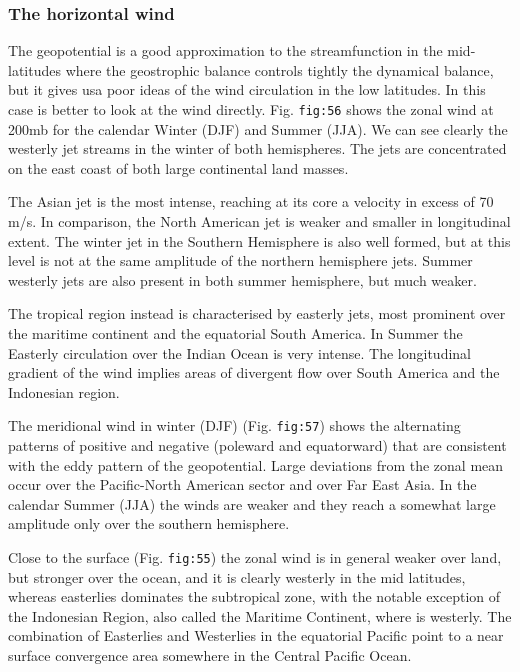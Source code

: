 \subsubsection{The horizontal wind}\label{the-horizontal-wind}

The geopotential is a good approximation to the streamfunction in the
mid-latitudes where the geostrophic balance controls tightly the
dynamical balance, but it gives usa poor ideas of the wind circulation
in the low latitudes. In this case is better to look at the wind
directly. Fig. \texttt{fig:56} shows the zonal wind at 200mb for the
calendar Winter (DJF) and Summer (JJA). We can see clearly the westerly
jet streams in the winter of both hemispheres. The jets are concentrated
on the east coast of both large continental land masses.

The Asian jet is the most intense, reaching at its core a velocity in
excess of 70 m/s. In comparison, the North American jet is weaker and
smaller in longitudinal extent. The winter jet in the Southern
Hemisphere is also well formed, but at this level is not at the same
amplitude of the northern hemisphere jets. Summer westerly jets are also
present in both summer hemisphere, but much weaker.

The tropical region instead is characterised by easterly jets, most
prominent over the maritime continent and the equatorial South America.
In Summer the Easterly circulation over the Indian Ocean is very
intense. The longitudinal gradient of the wind implies areas of
divergent flow over South America and the Indonesian region.

The meridional wind in winter (DJF) (Fig. \texttt{fig:57}) shows the
alternating patterns of positive and negative (poleward and equatorward)
that are consistent with the eddy pattern of the geopotential. Large
deviations from the zonal mean occur over the Pacific-North American
sector and over Far East Asia. In the calendar Summer (JJA) the winds
are weaker and they reach a somewhat large amplitude only over the
southern hemisphere.

Close to the surface (Fig. \texttt{fig:55}) the zonal wind is in general
weaker over land, but stronger over the ocean, and it is clearly
westerly in the mid latitudes, whereas easterlies dominates the
subtropical zone, with the notable exception of the Indonesian Region,
also called the Maritime Continent, where is westerly. The combination
of Easterlies and Westerlies in the equatorial Pacific point to a near
surface convergence area somewhere in the Central Pacific Ocean.

